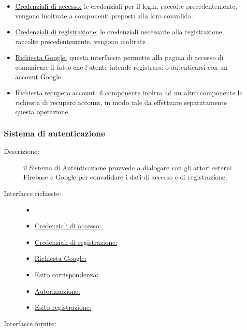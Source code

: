 \documentclass[11pt, a4paper]{article}
\theoremstyle{definition} %
\begin{document}
\begin{description}
\begin{itemize}
        \item \underline{Credenziali di accesso:} le credenziali per il login,
        raccolte precedentemente, vengono inoltrate a componenti preposti alla
        loro convalida.

        \item \underline{Credenziali di registrazione:} le credenziali necessarie
        alla registrazione, raccolte precedentemente, vengono inoltrate 

        \item \underline{Richiesta Google:} questa interfaccia permette alla
        pagina di accesso di comunicare il fatto che l'utente intende registrarsi
        o autenticarsi con un account Google.

        \item \underline{Richiesta recupero account:} il componente inoltra
        ad un altro componente la richiesta di recupero account, in modo tale
        da effettuare separatamente questa operazione.
    \end{itemize}
\end{description}
\subsubsection{Sistema di autenticazione}
\begin{description}
    \item[Descrizione:] il Sistema di Autenticazione provvede a dialogare
    con gli attori esterni Firebase e Google per convalidare i dati di accesso
    e di registrazione.

    \item[Interfacce richieste:]
    \begin{itemize}
        \item[]
        \item \underline{Credenziali di accesso:}
        \item \underline{Credenziali di registrazione:}
        \item \underline{Richiesta Google:}
        \item \underline{Esito corrispondenza:}
        \item \underline{Autorizzazione:}
        \item \underline{Esito registrazione:}
    \end{itemize}

    \item[Interfacce fornite:]
\end{description}
\fi
\end{document}
